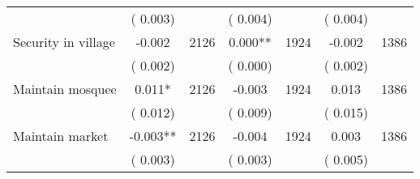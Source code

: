 \begin{tabular}{l*{6}{c}}
                       &       (       0.003)            &                               &       (       0.004)            &                               &       (       0.004)            &                               \\
Security in village        &             -0.002      &       2126       &              0.000**      &       1924       &             -0.002      &       1386       \\
                       &       (       0.002)            &                               &       (       0.000)            &                               &       (       0.002)            &                               \\
Maintain mosquee        &              0.011*      &       2126       &             -0.003      &       1924       &              0.013      &       1386       \\
                       &       (       0.012)            &                               &       (       0.009)            &                               &       (       0.015)            &                               \\
Maintain market        &             -0.003**      &       2126       &             -0.004      &       1924       &              0.003      &       1386       \\
                       &       (       0.003)            &                               &       (       0.003)            &                               &       (       0.005)            &                               \\
\hline \end{tabular}